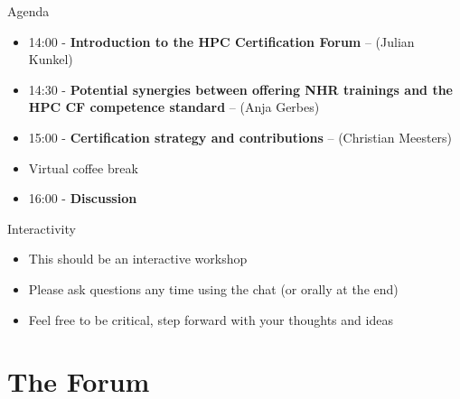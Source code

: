 \documentclass[compress,aspectratio=169]{beamer}
\begin{document}
\begin{frame}{Agenda}
  \begin{itemize}
    \item 14:00 - \textbf{Introduction to the HPC Certification Forum} -- (Julian Kunkel)
    \item 14:30 - \textbf{Potential synergies between offering NHR trainings and the HPC CF competence standard} -- (Anja Gerbes)
    \item 15:00 - \textbf{Certification strategy and contributions} -- (Christian Meesters)
    \item Virtual coffee break
    \item 16:00 - \textbf{Discussion}
  \end{itemize}
  
  \begin{block}{Interactivity}
  \begin{itemize}
  \item This should be an interactive workshop
  \item Please ask questions any time using the chat (or orally at the end)
  \item Feel free to be critical, step forward with your thoughts and ideas
  \end{itemize}
  \end{block}
\end{frame}





\section{The Forum}
\sectionIntroHidden

\subsection{}
\end{document}
